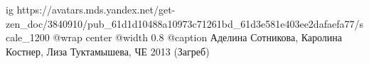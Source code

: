  
 
 
 
 

\ifcmt
  ig https://avatars.mds.yandex.net/get-zen_doc/3840910/pub_61d1d10488a10973c71261bd_61d3e581e403ee2dafaefa77/scale_1200
	@wrap center
	@width 0.8
	@caption Аделина Сотникова, Каролина Костнер, Лиза Туктамышева, ЧЕ 2013 (Загреб)
\fi
